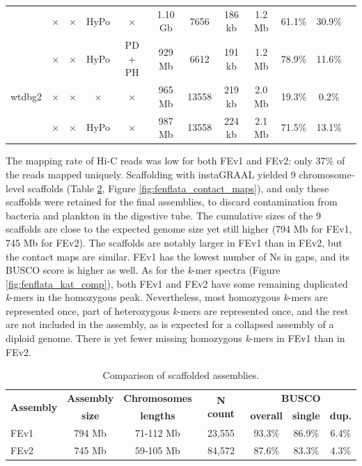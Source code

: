 \begin{table}
{\begin{tabular}{lccccccccccc}
        & $\times$ & $\times$ & HyPo & $\times$ & 1.10 Gb & 7656 & 186 kb & 1.2 Mb & 61.1\% & 30.9\% \\
        & $\times$ & $\times$ & HyPo & PD + PH & 929 Mb & 6612 & 191 kb & 1.2 Mb & 78.9\% & 11.6\% \\
    \hline
    wtdbg2 & $\times$ & $\times$ & $\times$ & $\times$ & 965 Mb & 13558 & 219 kb & 2.0 Mb & 19.3\% & 0.2\% \\
        & $\times$ & $\times$ & HyPo & $\times$ & 987 Mb & 13558 & 224 kb & 2.1 Mb & 71.5\% & 13.1\% \\
    \hline
\end{tabular}
}
\label{tab:chaeto_assemblies}
\end{table}

The mapping rate of Hi-C reads was low for both FEv1 and FEv2: only 37\% of the reads mapped uniquely. Scaffolding with instaGRAAL yielded 9 chromosome-level scaffolds (Table \ref{tab:chaeto_scaffolded_assemblies}, Figure \ref{fig:fenflata_contact_maps}), and only these scaffolds were retained for the final assemblies, to discard contamination from bacteria and plankton in the digestive tube. The cumulative sizes of the 9 scaffolds are close to the expected genome size yet still higher (794 Mb for FEv1, 745 Mb for FEv2). The scaffolds are notably larger in FEv1 than in FEv2, but the contact maps are similar. FEv1 has the lowest number of Ns in gaps, and its BUSCO score is higher as well. As for the \textit{k}-mer spectra (Figure \ref{fig:fenflata_kat_comp}), both FEv1 and FEv2 have some remaining duplicated \textit{k}-mers in the homozygous peak. Nevertheless, most homozygous \textit{k}-mers are represented once, part of heterozygous \textit{k}-mers are represented once, and the rest are not included in the assembly, as is expected for a collapsed assembly of a diploid genome. There is yet fewer missing homozygous \textit{k}-mers in FEv1 than in FEv2.

\begin{table}[H]
\centering
\caption{Comparison of scaffolded assemblies.}
\begin{tabular}{lcccccc}
   \hline
    \multirow{2}{*}{\textbf{Assembly}} & \textbf{Assembly} & \textbf{Chromosomes} & \multirow{2}{*}{\textbf{N count}} & \multicolumn{3}{c}{\textbf{BUSCO}} \\
        & \textbf{size} & \textbf{lengths} &  & \textbf{overall} & \textbf{single} & \textbf{dup.} \\
    \hline
    FEv1 & 794 Mb & 71-112 Mb & 23,555 & 93.3\% & 86.9\% & 6.4\% \\
    FEv2 & 745 Mb & 59-105 Mb & 84,572 & 87.6\% & 83.3\% & 4.3\% \\
    \hline
\end{tabular}
\label{tab:chaeto_scaffolded_assemblies}
\end{table}

